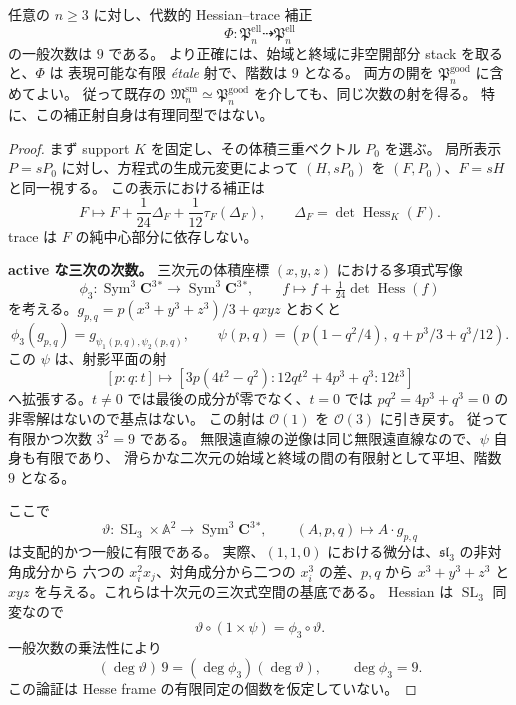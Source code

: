 \begin{theorem}[補正射の一般次数]
\label{thm:nfm-correction-degree-nine}
任意の $n\geq3$ に対し、代数的 Hessian--trace 補正
\[
 \Phi:\mathfrak P_n^{\mathrm{ell}}\dashrightarrow
       \mathfrak P_n^{\mathrm{ell}}
\]
の一般次数は $9$ である。
より正確には、始域と終域に非空開部分 stack を取ると、$\Phi$ は
表現可能な有限 \emph{\'etale} 射で、階数は $9$ となる。
両方の開を $\mathfrak P_n^{\mathrm{good}}$ に含めてよい。
従って既存の $\mathfrak M_n^{\mathrm{sm}}\simeq
\mathfrak P_n^{\mathrm{good}}$ を介しても、同じ次数の射を得る。
特に、この補正射自身は有理同型ではない。
\end{theorem}

\begin{proof}
まず support $K$ を固定し、その体積三重ベクトル $P_0$ を選ぶ。
局所表示 $P=sP_0$ に対し、方程式の生成元変更によって
$(H,sP_0)$ を $(F,P_0)$、$F=sH$ と同一視する。
この表示における補正は
\begin{equation}\label{eq:nfm-normalized-correction-map}
 F\longmapsto F+\frac1{24}\Delta_F
                  +\frac1{12}\tau_F(\Delta_F),
 \qquad \Delta_F=\det\operatorname{Hess}_K(F).
\end{equation}
trace は $F$ の純中心部分に依存しない。

\smallskip\noindent
\textbf{active な三次の次数。}
三次元の体積座標 $(x,y,z)$ における多項式写像
\[
 \phi_3:\operatorname{Sym}^3\mathbf C^3{}^*
   \longrightarrow\operatorname{Sym}^3\mathbf C^3{}^*,
 \qquad f\longmapsto f+\tfrac1{24}\det\operatorname{Hess}(f)
\]
を考える。$g_{p,q}=p(x^3+y^3+z^3)/3+qxyz$ とおくと
\[
 \phi_3(g_{p,q})=g_{\psi_1(p,q),\psi_2(p,q)},\qquad
 \psi(p,q)=\left(p(1-q^2/4),\ q+p^3/3+q^3/12\right).
\]
この $\psi$ は、射影平面の射
\begin{equation}\label{eq:nfm-projective-correction-chart}
 [p:q:t]\longmapsto
 [3p(4t^2-q^2):12qt^2+4p^3+q^3:12t^3]
\end{equation}
へ拡張する。$t\ne0$ では最後の成分が零でなく、$t=0$ では
$pq^2=4p^3+q^3=0$ の非零解はないので基点はない。
この射は $\mathcal O(1)$ を $\mathcal O(3)$ に引き戻す。
従って有限かつ次数 $3^2=9$ である。
無限遠直線の逆像は同じ無限遠直線なので、$\psi$ 自身も有限であり、
滑らかな二次元の始域と終域の間の有限射として平坦、階数 $9$ となる。

ここで
\[
 \vartheta:\operatorname{SL}_3\times\mathbb A^2
    \longrightarrow\operatorname{Sym}^3\mathbf C^3{}^*,
 \qquad (A,p,q)\longmapsto A\cdot g_{p,q}
\]
は支配的かつ一般に有限である。
実際、$(1,1,0)$ における微分は、$\mathfrak{sl}_3$ の非対角成分から
六つの $x_i^2x_j$、対角成分から二つの $x_i^3$ の差、$p,q$ から
$x^3+y^3+z^3$ と $xyz$ を与える。これらは十次元の三次式空間の基底である。
Hessian は $\operatorname{SL}_3$ 同変なので
\[
 \vartheta\circ(1\times\psi)=\phi_3\circ\vartheta.
\]
一般次数の乗法性により
\[
 (\deg\vartheta)\,9=(\deg\phi_3)(\deg\vartheta),
 \qquad \deg\phi_3=9.
\]
この論証は Hesse frame の有限同定の個数を仮定していない。


\end{proof}
